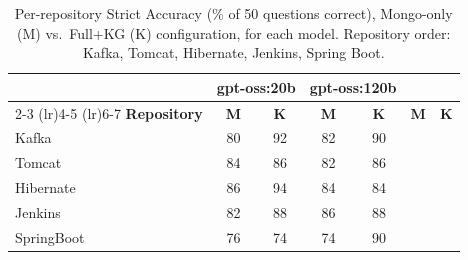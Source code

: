 \begin{table}[t]
\centering
\footnotesize
\setlength{\tabcolsep}{3pt}
\caption{Per-repository Strict Accuracy (\% of 50 questions correct), Mongo-only (M) vs.\ Full+KG (K) configuration, for each model. Repository order: Kafka, Tomcat, Hibernate, Jenkins, Spring Boot.}
\label{tab:per-repo}
\begin{tabular}{lcccccc}
\toprule
 & \multicolumn{2}{c}{\textbf{gpt-oss:20b}} & \multicolumn{2}{c}{\textbf{gpt-oss:120b}} \\
\cmidrule(lr){2-3} \cmidrule(lr){4-5} \cmidrule(lr){6-7}
\textbf{Repository} & \textbf{M} & \textbf{K} & \textbf{M} & \textbf{K} & \textbf{M} & \textbf{K} \\
\midrule
Kafka   & 80  & 92  & 82  & 90  \\
Tomcat   & 84  & 86  & 82  & 86  \\
Hibernate   & 86  & 94  & 84  & 84  \\
Jenkins   & 82  & 88  & 86  & 88  \\
SpringBoot   & 76  & 74  & 74  & 90  \\
\bottomrule
\end{tabular}
\end{table}
